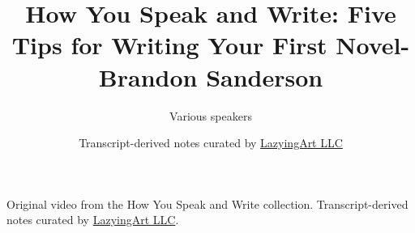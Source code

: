 \documentclass[11pt,oneside]{book}
\begin{document}
\frontmatter
\title{How You Speak and Write: Five Tips for Writing Your First Novel-Brandon Sanderson}
\author{Various speakers}
\date{Transcript-derived notes curated by \href{https://lazying.art}{LazyingArt LLC}}
\maketitle
\begin{center}
\small Original video from the How You Speak and Write collection. Transcript-derived notes curated by \href{https://lazying.art}{LazyingArt LLC}.
\end{center}
\clearpage
\mainmatter

\end{document}
